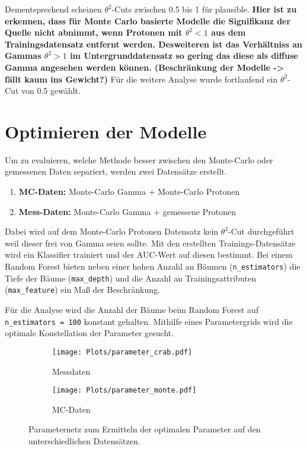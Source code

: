 Dementsprechend scheinen $\theta^{2}$-Cuts zwischen \num{0.5} bis \num{1} für plausible. 
\textbf{Hier ist zu erkennen, dass für Monte Carlo basierte Modelle die Signifikanz der Quelle nicht abnimmt, wenn Protonen mit $\theta^{2} < 1$ aus dem Trainingsdatensatz entfernt werden. 
Desweiteren ist das Verhältniss an Gammas $\theta^{2} > 1$ im Untergrunddatensatz so gering das diese als diffuse Gamma angesehen werden können. (Beschränkung der Modelle -> fällt kaum ins Gewicht?)} 
Für die weitere Analyse wurde fortlaufend ein $\theta^{2}$-Cut von \num{0.5} gewählt. 
\section{Optimieren der Modelle}
Um zu evaluieren, welche Methode besser zwischen den Monte-Carlo oder gemessenen Daten separiert, werden zwei Datensätze erstellt. 
\begin{enumerate}
  \item \textbf{MC-Daten:} Monte-Carlo Gamma + Monte-Carlo Protonen
  \item \textbf{Mess-Daten:} Monte-Carlo Gamma + gemessene Protonen 
\end{enumerate}
Dabei wird auf dem Monte-Carlo Protonen Datensatz kein $\theta^{2}$-Cut durchgeführt weil dieser frei von Gamma seien sollte.
Mit den erstellten Trainings-Datensätze wird ein Klassifier trainiert und der AUC-Wert auf diesen bestimmt.
Bei einem Random Forest bieten neben einer hohen Anzahl an Bäumen (\texttt{n\_estimators}) die Tiefe der Bäume (\texttt{max\_depth}) und die Anzahl an Trainingsattributen (\texttt{max\_feature}) ein Maß der Beschränkung.

Für die Analyse wird die Anzahl der Bäume beim Random Forest auf \texttt{n\_estimators = 100} konstant gehalten. 
Mithilfe eines Parametergrids wird die optimale Konstellation der Parameter gesucht. 
\begin{figure}
  \begin{subfigure}[b]{0.5\textwidth}
	\texttt{[image: Plots/parameter\_crab.pdf]}
	\caption{Messdaten}
	\label{fig:messGrid}
  \end{subfigure}
  \begin{subfigure}[b]{0.5\textwidth}
	\texttt{[image: Plots/parameter\_monte.pdf]}
	\caption{MC-Daten}
	\label{fig:mcGrid}
  \end{subfigure}
  \caption{Parameternetz zum Ermitteln der optimalen Parameter auf den unterschiedlichen Datensätzen.}
\end{figure}

